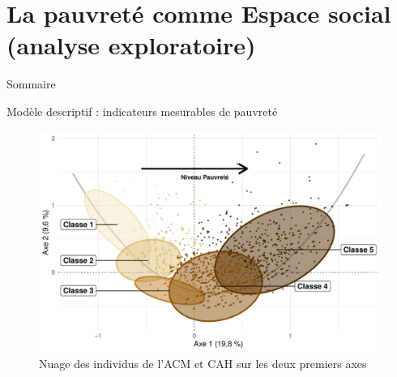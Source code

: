 \documentclass[10pt,xcolor=table,color={dvipsnames,usenames},ignorenonframetext,usepdftitle=false,french]{beamer}
\begin{document}
\hypertarget{esexplo}{%
\section{La pauvreté comme Espace social (analyse
exploratoire)}\label{esexplo}}

\begin{frame}{Sommaire}
\protect\hypertarget{sommaire-2}{}
\end{frame}

\begin{frame}{Modèle descriptif : indicateurs mesurables de pauvreté}
\protect\hypertarget{moduxe8le-descriptif-indicateurs-mesurables-de-pauvretuxe9}{}
\begin{figure}[!ht]

{\centering \includegraphics[width=1\linewidth]{M2_ANTUNEZ_SQD_ORAL_files/figure-beamer/cah1-1} 

}

\caption[Nuage des individus de l'ACM et CAH sur les deux premiers axes]{Nuage des individus de l'ACM et CAH sur les deux premiers axes}\label{fig:cah1}

\footnotesize
\normalsize\end{figure}
\end{frame}
\end{document}
